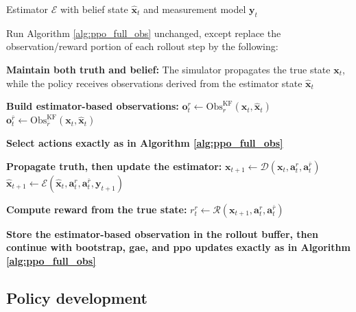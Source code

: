 \begin{algorithm}[H]
\caption{\acs{kf}-On Modifications to Algorithm \ref{alg:ppo_full_obs}}
\label{alg:ppo_kf_on}
\begin{algorithmic}[1]
\Require Estimator $\mathcal{E}$ with belief state $\hat{\mathbf{x}}_t$ and measurement model $\mathbf{y}_t$

\State Run Algorithm \ref{alg:ppo_full_obs} unchanged, except replace the observation/reward portion of each rollout step by the following:

\State \textbf{Maintain both truth and belief:}
\State \hspace{1em} The simulator propagates the true state $\mathbf{x}_t$, while the policy receives observations derived from the estimator state $\hat{\mathbf{x}}_t$

\State \textbf{Build estimator-based observations:}
\State \hspace{1em} $\mathbf{o}_t^r \leftarrow \mathrm{Obs}^{\mathrm{KF}}_r(\mathbf{x}_t,\hat{\mathbf{x}}_t)$
\State \hspace{1em} $\mathbf{o}_t^{\bar r} \leftarrow \mathrm{Obs}^{\mathrm{KF}}_{\bar r}(\mathbf{x}_t,\hat{\mathbf{x}}_t)$

\State \textbf{Select actions exactly as in Algorithm \ref{alg:ppo_full_obs}}

\State \textbf{Propagate truth, then update the estimator:}
\State \hspace{1em} $\mathbf{x}_{t+1} \leftarrow \mathcal{D}(\mathbf{x}_t,\mathbf{a}_t^r,\mathbf{a}_t^{\bar r})$
\State \hspace{1em} $\hat{\mathbf{x}}_{t+1} \leftarrow \mathcal{E}(\hat{\mathbf{x}}_t,\mathbf{a}_t^r,\mathbf{a}_t^{\bar r},\mathbf{y}_{t+1})$

\State \textbf{Compute reward from the true state:}
\State \hspace{1em} $r_t^r \leftarrow \mathcal{R}(\mathbf{x}_{t+1},\mathbf{a}_t^r,\mathbf{a}_t^{\bar r})$

    \State \textbf{Store the estimator-based observation in the rollout buffer, then continue with bootstrap, \acs{gae}, and \acs{ppo} updates exactly as in Algorithm \ref{alg:ppo_full_obs}}
\end{algorithmic}
\end{algorithm}


\subsection{Policy development}
\label{subsec:policy-development}



